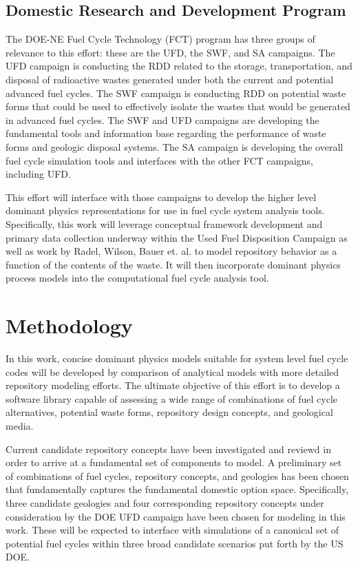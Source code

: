 \subsection{Domestic Research and Development Program}

The DOE-NE Fuel Cycle Technology (FCT) program has three groups of relevance to 
this effort: these are the \gls{UFD}, the \gls{SWF}, and \gls{SA} campaigns.  
The \gls{UFD} campaign is conducting the \gls{RDD} related to the storage, 
transportation, and disposal of radioactive wastes generated under both the 
current and potential advanced fuel cycles.  The SWF campaign is conducting 
\gls{RDD} on potential waste forms that could be used to effectively isolate the 
wastes that would be generated in advanced fuel cycles.  The \gls{SWF} and
\gls{UFD} campaigns are developing the fundamental tools and information base 
regarding the performance of waste forms and geologic disposal systems.  The 
\gls{SA} campaign is developing the overall fuel cycle simulation tools and 
interfaces with the other FCT campaigns, including \gls{UFD}.  

This effort will interface with those campaigns to develop the higher level
dominant physics representations for use in fuel cycle system analysis tools.
Specifically, this work will leverage conceptual framework development and
primary data collection underway within the Used Fuel Disposition Campaign as
well as work by Radel, Wilson, Bauer et. al. to model repository behavior as a
function of the contents of the waste.  It will then incorporate dominant
physics process models into the \Cyclus computational fuel cycle analysis tool.




\section{Methodology} 


In this work, concise dominant physics models suitable for system level fuel 
cycle codes will be developed by comparison of analytical models with more 
detailed repository modeling efforts. The ultimate objective of this effort is 
to develop a software library capable of assessing a wide range of combinations 
of fuel cycle alternatives, potential waste forms, repository design concepts, 
and geological media. 


Current candidate repository concepts have been investigated and reviewd in 
order to arrive at a fundamental set of components to model. A preliminary set 
of combinations of fuel cycles, repository concepts, and geologies has been 
chosen that fundamentally captures the fundamental domestic option space. 
Specifically, three candidate geologies and four corresponding repository 
concepts under consideration by the \gls{DOE} \gls{UFD} campaign have been 
chosen for modeling in this work. These will be expected to interface
with \Cyclus simulations of a canonical set of potential fuel cycles within 
three broad candidate scenarios put forth by the \gls{US} \gls{DOE}.


